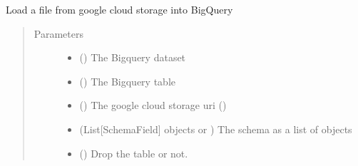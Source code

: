 \documentclass[letterpaper,10pt,english]{sphinxmanual}
\begin{document}
\begin{fulllineitems}
\label{\detokenize{omicidx.bigquery_utils:omicidx.bigquery_utils.load_json_to_bigquery}}
Load a file from google cloud storage into BigQuery
\begin{quote}\begin{description}
\item[{Parameters}] \leavevmode\begin{itemize}
\item {} 
 () \textendash{} The Bigquery dataset

\item {} 
 () \textendash{} The Bigquery table

\item {} 
 () \textendash{} The google cloud storage uri ()

\item {} 
 (List{[}SchemaField{]} objects or ) \textendash{} The schema as a list of  objects

\item {} 
 () \textendash{} Drop the table or not.

\end{itemize}

\end{description}\end{quote}

\end{fulllineitems}

\end{document}
